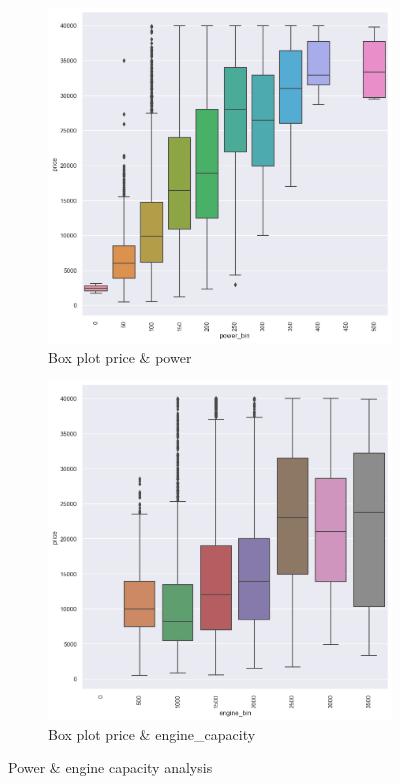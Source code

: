 \begin{itemize}
    \begin{figure}[!h]
        \begin{subfigure}[b]{0.48\linewidth}
            \centering
            \includegraphics[width=\linewidth]{images/priceprediction/boxplots/power_price.png}
            \caption{Box plot price \& power}
            \label{fig:power-box}
        \end{subfigure}
        \hfill
        \begin{subfigure}[b]{0.48\linewidth}
            \centering
            \includegraphics[width=\linewidth]{images/priceprediction/boxplots/engine_capacity_price.png}
            \caption{Box plot price \& engine\_capacity}
            \label{fig:eng-box}
        \end{subfigure}
        \caption{Power \& engine capacity analysis}
        \label{fig:pow-eng-box}
    \end{figure}
    

\end{itemize}
